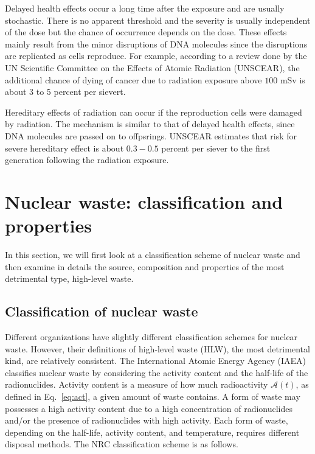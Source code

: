 \documentclass[nofootinbib,preprint,aps]{revtex4-1}
\begin{document}
        Delayed health effects occur a long time after the exposure and are usually stochastic. There is
        no apparent threshold and the severity is usually independent of the dose but
        the chance of occurrence depends on the dose.\cite{u16}
        These effects mainly result from the minor disruptions of DNA molecules since the disruptions are replicated
        as cells reproduce.
        For example, according to a review done by the UN Scientific Committee on the Effects of Atomic Radiation
        (UNSCEAR), the additional chance of dying of cancer due to radiation exposure above $100$ mSv is
        about 3 to 5 percent per sievert.\cite{unscear16}

        Hereditary effects of radiation can occur if the reproduction cells were damaged by radiation.
        The mechanism is similar to that of delayed health effects, since DNA molecules are passed on
        to offpsrings.
        UNSCEAR estimates that risk for severe hereditary effect is about $0.3-0.5$ percent per siever to
        the first generation following the radiation exposure.\cite{u16, unscear16}
\section{Nuclear waste: classification and properties}
\label{sec:waste}
    In this section, we will first look at a classification scheme of nuclear waste and then
    examine in details the source, composition and properties of the most detrimental type, high-level waste.
    \subsection{Classification of nuclear waste}
    Different organizations have slightly different classification schemes for nuclear waste.
    However, their definitions of high-level waste (HLW), the most detrimental kind, are relatively consistent.
    The International Atomic Energy Agency (IAEA) classifies nuclear waste by considering the activity
    content and the half-life of the radionuclides.
    Activity content is a measure of how much radioactivity $\mathcal{A}(t)$, as defined in Eq.~\ref{eq:act},
    a given amount of waste contains.
    A form of waste may possesses a high activity content due to
    a high concentration of radionuclides and/or the presence of radionuclides with high activity.\cite{iaea09}
    Each form of waste, depending on the half-life, activity content, and temperature, requires different
    disposal methods. The NRC classification scheme is as follows.\cite{nrc09}
\end{document}
